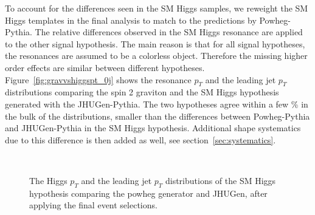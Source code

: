 To account for the differences seen in the SM Higgs samples, 
we reweight the SM Higgs templates in the final analysis 
to match to the predictions by Powheg-Pythia. 
The relative differences observed in the SM Higgs resonance are 
applied to the other signal hypothesis. 
The main reason is that for all signal hypotheses, the resonances 
are assumed to be a colorless object. Therefore the missing higher 
order effects are similar between different hypotheses. 
Figure~\ref{fig:gravvshiggspt_0j} shows the resonance $p_T$ and 
the leading jet $p_T$ distributions comparing the spin 2 
graviton and the SM Higgs hypothesis generated with the JHUGen-Pythia. 
The two hypotheses agree within a few \% in the bulk of the distributions, 
smaller than the differences between Powheg-Pythia and JHUGen-Pythia 
in the SM Higgs hypothesis. 
Additional shape systematics due to this difference is then added as well, see section~\ref{sec:systematics}. 


\begin{figure}[!hbtp]
\centering
{}
\\
\caption{The Higgs $p_T$ and the leading jet $p_T$ distributions of the 
SM Higgs hypothesis comparing the powheg generator and JHUGen, after 
applying the final event selections. 
}
\label{fig:higgspt_0j}
\end{figure}



